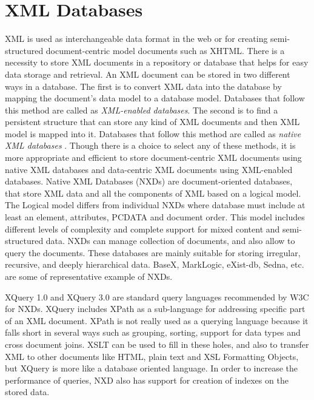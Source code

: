\section{XML Databases}

  XML is used as interchangeable data format in the web or for creating semi-structured document-centric model documents such as XHTML. There is a necessity to store XML documents in a repository or database that helps for easy data storage and retrieval. An XML document can be stored in two different ways in a database. The first is to convert XML data into the database by mapping the document's data model to a database model. Databases that follow this method are called as \textit{XML-enabled databases}. The second is to find a persistent structure that can store any kind of XML documents and then XML model is mapped into it. Databases that follow this method are called as \textit{native XML databases} \cite{pavlovic2007native}. Though there is a choice to select any of these methods, it is more appropriate and efficient to store document-centric XML documents using native XML databases and data-centric  XML documents using XML-enabled databases.	Native XML Databases (NXDs) are document-oriented databases, that store XML data and all the components of XML based on a logical model. The Logical model differs from individual NXDs where database must include at least an element, attributes, PCDATA and document order. This model includes different levels of complexity and complete support for mixed content and semi-structured data. NXDs can manage collection of documents, and also allow to query the documents. These databases are mainly suitable for storing irregular, recursive, and deeply hierarchical data.  BaseX, MarkLogic, eXist-db, Sedna, etc. are some of representative example of NXDs. 
  \par XQuery 1.0 and XQuery 3.0 are standard query languages recommended by W3C for NXDs. XQuery includes XPath as a sub-language for addressing specific part of an XML document. XPath is not really used as a querying language because it falls short in several ways such as grouping, sorting, support for data types and cross document joins. XSLT can be used to fill in these holes, and also to transfer XML to other documents like HTML, plain text and XSL Formatting Objects, but XQuery is more like a database oriented language.  In order to increase the performance of queries, NXD also has support for creation of indexes on the stored data.\cite{pavlovic2007native}
